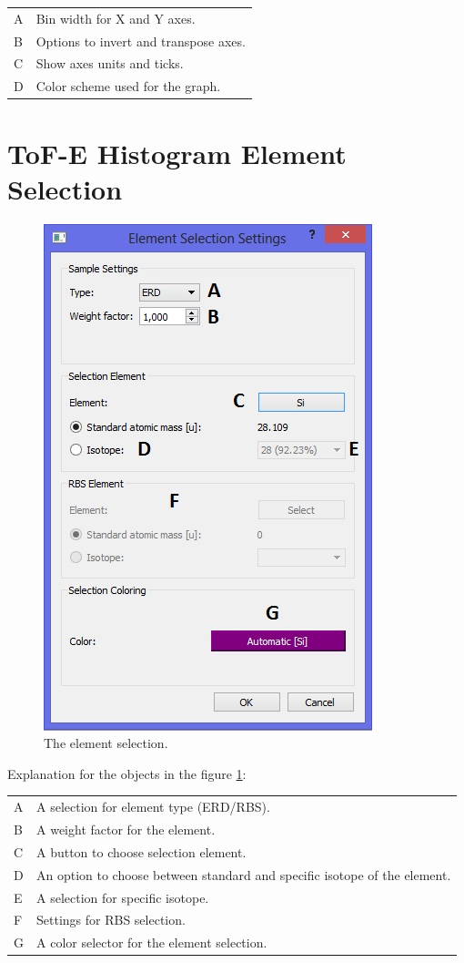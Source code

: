 \documentclass{scrreprt}
\begin{document}
\begin{tabular}{ll}
A & Bin width for X and Y axes.\\
B & Options to invert and transpose axes.\\
C & Show axes units and ticks.\\
D & Color scheme used for the graph.\\
\end{tabular}

\section{ToF-E Histogram Element Selection}\label{measurement-tofe-element}
\begin{figure}[H]
\centering
\includegraphics[scale=1]{measurement-tofe-element}
\caption{The element selection.}
\label{fig-tofe-element}
\end{figure}
Explanation for the objects in the figure \ref{fig-tofe-element}:

\begin{tabular}{ll}
A & A selection for element type (ERD/RBS).\\
B & A weight factor for the element.\\
C & A button to choose selection element.\\
D & An option to choose between standard and specific isotope of the element.\\
E & A selection for specific isotope.\\
F & Settings for RBS selection.\\
G & A color selector for the element selection.\\
\end{tabular}
\end{document}
